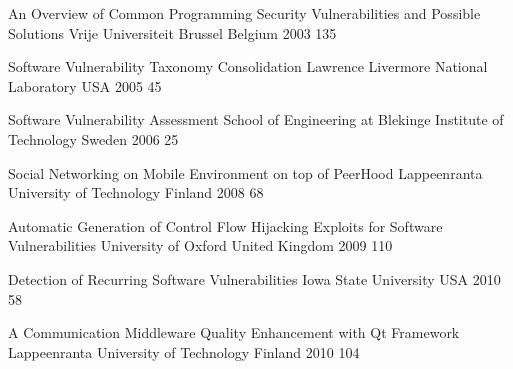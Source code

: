 \renewcommand{\refname}{REFERENCES} %
\cleardoublepage
{}
{}

\begin{comment}
INSTRUCTIONS FOR WRITING A MASTER'S THESIS

References are either in alphabetical order (according to the first author) or in the order of
citing. All references are in one list only. All bibliographic information is included. If a
reference is a thesis then the type of the thesis is included in the reference, i.e. mention
either “bachelor’s thesis”, “master’s thesis” or “doctoral thesis”.
\end{comment}

\begin{thebibliography}{9}


		{}
		{An Overview of Common Programming Security Vulnerabilities and Possible Solutions}
		{Vrije Universiteit Brussel}
		{Belgium}
		{2003}
		{135}
	
		{}
		{Software Vulnerability Taxonomy Consolidation}
		{Lawrence Livermore National Laboratory}
		{USA}
		{2005}
		{45}
	
		{}
		{Software Vulnerability Assessment}
		{School of Engineering at Blekinge Institute of Technology}
		{Sweden}
		{2006}
		{25}
	
		{}
		{Social Networking on Mobile Environment on top of PeerHood}
		{Lappeenranta University of Technology}
		{Finland}
		{2008}
		{68}
	
		{}
		{Automatic Generation of Control Flow Hijacking Exploits for Software Vulnerabilities}
		{University of Oxford}
		{United Kingdom}
		{2009}
		{110}
	
		{}
		{Detection of Recurring Software Vulnerabilities}
		{Iowa State University}
		{USA}
		{2010}
		{58}
	
		{}
		{A Communication Middleware Quality Enhancement with {Qt} Framework}
		{Lappeenranta University of Technology}
		{Finland}
		{2010}
		{104}


\end{thebibliography}
